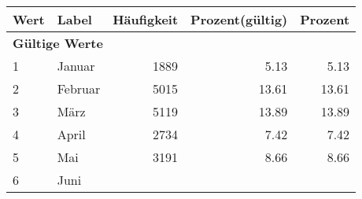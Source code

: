      \begin{longtable}{lXrrr}
     \toprule
     \textbf{Wert} & \textbf{Label} & \textbf{Häufigkeit} & \textbf{Prozent(gültig)} & \textbf{Prozent} \\
     \endhead
     \midrule
     \multicolumn{5}{l}{\textbf{Gültige Werte}}\\

     1 &
     \multicolumn{1}{X}{ Januar   } &


       \num{1889} &
       \num[round-mode=places,round-precision=2]{5,13} &
         \num[round-mode=places,round-precision=2]{5,13} \\

     2 &
     \multicolumn{1}{X}{ Februar   } &


       \num{5015} &
       \num[round-mode=places,round-precision=2]{13,61} &
         \num[round-mode=places,round-precision=2]{13,61} \\

     3 &
     \multicolumn{1}{X}{ März   } &


       \num{5119} &
       \num[round-mode=places,round-precision=2]{13,89} &
         \num[round-mode=places,round-precision=2]{13,89} \\

     4 &
     \multicolumn{1}{X}{ April   } &


       \num{2734} &
       \num[round-mode=places,round-precision=2]{7,42} &
         \num[round-mode=places,round-precision=2]{7,42} \\

     5 &
     \multicolumn{1}{X}{ Mai   } &


       \num{3191} &
       \num[round-mode=places,round-precision=2]{8,66} &
         \num[round-mode=places,round-precision=2]{8,66} \\

     6 &
     \multicolumn{1}{X}{ Juni   } &



\end{longtable}
